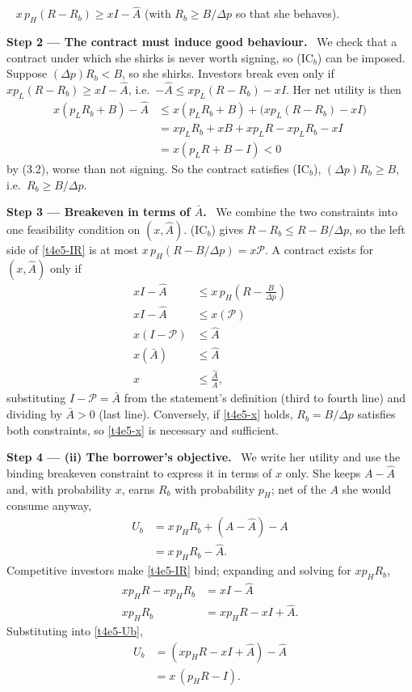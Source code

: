 \documentclass[11pt,a4paper]{article}
\newcommand{\step}[2]{\par\medskip\noindent\textbf{Step #1 --- #2.}~}
\newcommand{\answer}[1]{\par\smallskip\noindent\fbox{\textbf{Answer #1.}}~}
\begin{document}
\answer{(i)} $x\,p_H(R-R_b)\ge xI-\hat A$ (with $R_b\ge B/\Delta p$ so that she behaves).

\step{2}{The contract must induce good behaviour} We check that a contract under which she shirks
is never worth signing, so (IC$_b$) can be imposed. Suppose $(\Delta p)R_b<B$, so she shirks.
Investors break even only if $x p_L(R-R_b)\ge xI-\hat A$, i.e.\ $-\hat A\le x p_L(R-R_b)-xI$.
Her net utility is then
\begin{align}
  x(p_L R_b+B)-\hat A &\le x(p_L R_b+B)+\big(x p_L(R-R_b)-xI\big) \nonumber\\
                      &= x p_L R_b+xB+x p_L R-x p_L R_b-xI \nonumber\\
                      &= x(p_L R+B-I) < 0 \label{t4e5-shirk}
\end{align}
by (3.2), worse than not signing. So the contract satisfies (IC$_b$), $(\Delta p)R_b\ge B$, i.e.\
$R_b\ge B/\Delta p$.

\step{3}{Breakeven in terms of $\bar A$} We combine the two constraints into one feasibility
condition on $(x,\hat A)$. (IC$_b$) gives $R-R_b\le R-B/\Delta p$, so the
left side of \eqref{t4e5-IR} is at most $x\,p_H(R-B/\Delta p)=x\mathcal P$. A contract exists for $(x,\hat A)$ only if
\begin{align}
  x I-\hat A &\le x\,p_H\left(R-\frac{B}{\Delta p}\right) \nonumber\\
  x I-\hat A &\le x(\mathcal P) \nonumber\\
  x(I-\mathcal P) &\le \hat A \nonumber\\
  x(\bar A) &\le \hat A \nonumber\\
  x &\le \frac{\hat A}{\bar A}, \label{t4e5-x}
\end{align}
substituting $I-\mathcal P=\bar A$ from the statement's definition (third to fourth line) and
dividing by $\bar A>0$ (last line). Conversely, if \eqref{t4e5-x} holds, $R_b=B/\Delta p$ satisfies
both constraints, so \eqref{t4e5-x} is necessary and sufficient.

\step{4}{(ii) The borrower's objective} We write her utility and use the binding breakeven
constraint to express it in terms of $x$ only. She keeps $A-\hat A$ and, with probability $x$, earns
$R_b$ with probability $p_H$; net of the $A$ she would consume anyway,
\begin{align}
  U_b &= x\,p_H R_b+(A-\hat A)-A \nonumber\\
      &= x\,p_H R_b-\hat A. \label{t4e5-Ub}
\end{align}
Competitive investors make \eqref{t4e5-IR} bind; expanding and solving for $x p_H R_b$,
\begin{align}
  x p_H R-x p_H R_b &= xI-\hat A \nonumber\\
  x p_H R_b &= x p_H R-xI+\hat A. \nonumber
\end{align}
Substituting into \eqref{t4e5-Ub},
\begin{align}
  U_b &= (x p_H R-xI+\hat A)-\hat A \nonumber\\
      &= x\,(p_H R-I). \label{t4e5-Ubx}
\end{align}
\end{document}
